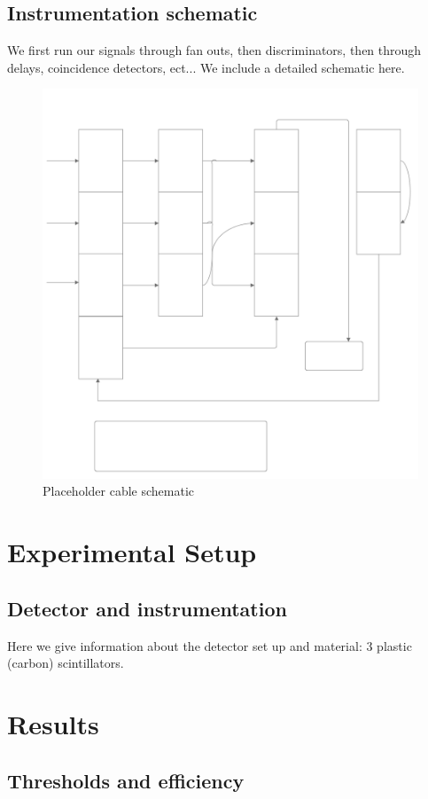 \documentclass[aps,prb,twocolumn,superscriptaddress,floatfix,longbibliography,citeautoscript]{revtex4-2}
\begin{document}
\subsection{Instrumentation schematic}
We first run our signals through fan outs, then discriminators, then through delays, coincidence detectors, ect... We include a detailed schematic here.
\begin{figure}
    \centering
    \includegraphics[width=0.5\linewidth]{schematic.png}
    \caption{Placeholder cable schematic}
    \label{fig:enter-label}
\end{figure}
\section{\label{sec:setup}Experimental Setup}
\subsection{Detector and instrumentation}
Here we give information about the detector set up and material: 3 plastic (carbon) scintillators. 




\section{\label{sec:Results} Results}
\subsection{Thresholds and efficiency}
\begin{acknowledgments}
\end{acknowledgments}
\end{document}
